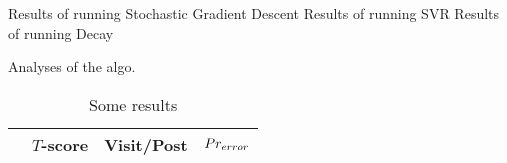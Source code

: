 Results of running Stochastic Gradient Descent
Results of running SVR
Results of running Decay


Analyses of the algo.
\begin{table}
\begin{center}
\begin{tabular}{| l | c | c | c|}
\hline
& $T$-score			   &	Visit/Post & 	$Pr_{error}$ \\
\hline
	
\hline
	
\hline
	
\hline
	
\hline
	
\hline
\end{tabular}
\end{center}
\caption{Some results}\label{tbl:diff_efal}
\end{table}





